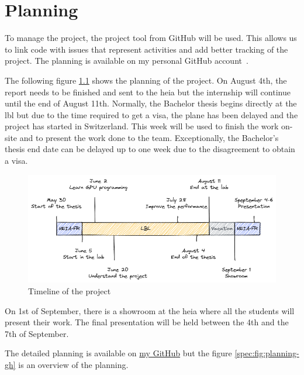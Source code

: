 \chapter{Planning}
\label{spec:ch:planning}

To manage the project, the project tool from GitHub will be used.
This allows us to link code with issues that represent activities and add better tracking of the project.
The planning is available on my personal GitHub account~\cite{github-project}.

The following figure \ref{spec:fig:timeline} shows the planning of the project.
On August 4th, the report needs to be finished and sent to the \acrshort{heia} but the internship will continue until the end of August 11th.
Normally, the Bachelor thesis begins directly at the \acrshort{lbl} but due to the time required to get a visa, the plane has been delayed and the project has started in Switzerland.
This week will be used to finish the work on-site and to present the work done to the team.
Exceptionally, the Bachelor's thesis end date can be delayed up to one week due to the disagreement to obtain a visa.

\begin{figure}[ht]
    \centering
    \includegraphics[width=\textwidth]{05-resources/img/spec/planning.excalidraw.png}
    \caption{Timeline of the project}
    \label{spec:fig:timeline}
\end{figure}


On 1st of September, there is a showroom at the \acrshort{heia} where all the students will present their work.
The final presentation will be held between the 4th and the 7th of September.

The detailed planning is available on \href{https://github.com/users/simbarras/projects/3/views/1}{my GitHub} but the figure \ref{spec:fig:planning-gh} is an overview of the planning.

